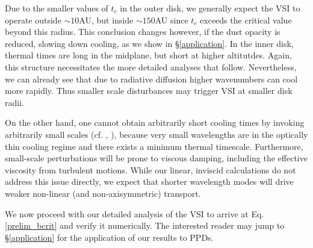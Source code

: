 \documentclass[iop, numberedappendix]{emulateapj}
\begin{document}
Due to the smaller values of $t_c$ in the outer disk, we generally expect the VSI to 
operate outside $\sim 10$AU, but inside $\sim 150$AU since $t_c$
exceeds the critical value beyond this radius. This conclusion changes however, if
the dust opacity is reduced,  
slowing down cooling, as we show in \S\ref{application}. %
In the inner disk, thermal times are long in the midplane, but short at higher altitutdes. 
Again, this structure necessitates the more detailed analyses that follow.  Nevertheless, we can already 
see that due to radiative diffusion higher wavenumbers can cool more rapidly.  Thus smaller scale disturbances 
may trigger VSI at smaller disk radii. 

On the other hand, one cannot obtain arbitrarily short cooling times
by invoking arbitrarily small scales (cf. \citealt{urpin03}, 
), because very small wavelengths are in the
optically thin cooling regime and there exists a minimum thermal
timescale. Furthermore, 
small-scale perturbations will be 
prone to viscous damping, including the effective viscosity from turbulent motions.
While our linear, inviscid calculations do not address this issue directly, we expect that 
shorter wavelength modes will drive weaker non-linear (and non-axisymmetric) transport. 


We now proceed with our detailed analysis of the VSI to arrive
at Eq. \ref{prelim_bcrit} and verify it numerically. The interested 
reader may jump to \S\ref{application} for the application of our
results to PPDs.     





 


\appendix




\end{document}

